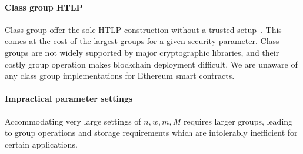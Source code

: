 \paragraph{Class group HTLP} 
Class group offer the sole HTLP construction without a trusted setup~\cite{CCS:TCLM21}. This comes at the cost of the largest groups for a given security parameter. Class groups are not widely supported by major cryptographic libraries, and their costly group operation makes blockchain deployment difficult. We are unaware of any class group implementations for Ethereum smart contracts.

\paragraph{Impractical parameter settings} 
Accommodating very large settings of $n,\allowbreak w,m,M$ requires larger groups, leading to group operations and storage requirements which are intolerably inefficient for certain applications.